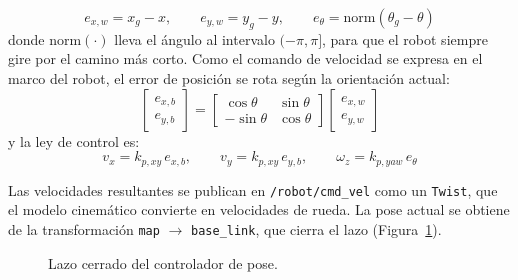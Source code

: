 \documentclass[11pt,a4paper]{article}
\begin{document}
\begin{equation}
e_{x,w} = x_g - x, \qquad e_{y,w} = y_g - y, \qquad e_\theta = \mathrm{norm}(\theta_g - \theta)
\end{equation}
donde $\mathrm{norm}(\cdot)$ lleva el ángulo al intervalo $(-\pi, \pi]$, para que el robot siempre gire por el camino más corto. Como el comando de velocidad se expresa en el marco del robot, el error de posición se rota según la orientación actual:
\begin{equation}
\begin{bmatrix} e_{x,b} \\ e_{y,b} \end{bmatrix} =
\begin{bmatrix} \cos\theta & \sin\theta \\ -\sin\theta & \cos\theta \end{bmatrix}
\begin{bmatrix} e_{x,w} \\ e_{y,w} \end{bmatrix}
\end{equation}
y la ley de control es:
\begin{equation}
v_x = k_{p,xy}\, e_{x,b}, \qquad v_y = k_{p,xy}\, e_{y,b}, \qquad \omega_z = k_{p,yaw}\, e_\theta
\label{eq:ley_control}
\end{equation}

Las velocidades resultantes se publican en \texttt{/robot/cmd\_vel} como un \texttt{Twist}, que el modelo cinemático convierte en velocidades de rueda. La pose actual se obtiene de la transformación \texttt{map} $\rightarrow$ \texttt{base\_link}, que cierra el lazo (Figura~\ref{fig:lazo_cerrado}).

\begin{figure}[htbp]
\centering
{}
\caption{Lazo cerrado del controlador de pose.}
\label{fig:lazo_cerrado}
\end{figure}
\end{document}

